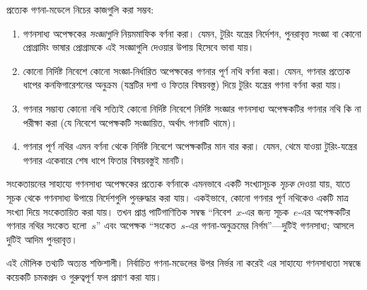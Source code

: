 \documentclass[../../../include/open-logic-section]{subfiles}
\begin{document}

প্রত্যেক গণনা-মডেলে নিচের কাজগুলি করা সম্ভব:
\begin{enumerate}
\item গণনসাধ্য অপেক্ষকের \emph{সংজ্ঞাগুলি} নিয়মমাফিক বর্ণনা করা। যেমন,
  টুরিং যন্ত্রের নির্দেশন, পুনরাবৃত্ত সংজ্ঞা বা কোনো প্রোগ্রামিং ভাষার
  প্রোগ্রামকে এই সংজ্ঞাগুলি দেওয়ার উপায় হিসেবে ভাবা যায়।
\item কোনো নির্দিষ্ট নিবেশে কোনো সংজ্ঞা-নির্ধারিত অপেক্ষকের গণনার পূর্ণ
  নথি বর্ণনা করা। যেমন, গণনার প্রত্যেক ধাপের কনফিগারেশনের অনুক্রম
  (যন্ত্রটির দশা ও ফিতার বিষয়বস্তু) দিয়ে টুরিং যন্ত্রের গণনা বর্ণনা করা
  যায়।
\item গণনার সম্ভাব্য কোনো নথি সত্যিই কোনো নির্দিষ্ট নিবেশে নির্দিষ্ট
  সংজ্ঞার গণনসাধ্য অপেক্ষকটির গণনার নথি কি না পরীক্ষা করা (যে নিবেশে
  অপেক্ষকটি সংজ্ঞায়িত, অর্থাৎ গণনাটি থামে)।
\item গণনার পূর্ণ নথির এমন বর্ণনা থেকে নির্দিষ্ট নিবেশে অপেক্ষকটির মান
  বার করা। যেমন, থেমে যাওয়া টুরিং-যন্ত্রের গণনার একেবারে শেষ ধাপে ফিতার
  বিষয়বস্তুই মানটি।
\end{enumerate}

সংকেতায়নের সাহায্যে গণনসাধ্য অপেক্ষকের প্রত্যেক বর্ণনাকে এমনভাবে একটি
সংখ্যাসূচক \emph{সূচক} দেওয়া যায়, যাতে সূচক থেকে গণনসাধ্য উপায়ে
নির্দেশগুলি পুনরুদ্ধার করা যায়। একইভাবে, কোনো গণনার পূর্ণ নথিকেও একটি
মাত্র সংখ্যা দিয়ে সংকেতায়িত করা যায়। তখন প্রাপ্ত পাটিগাণিতিক সম্বন্ধ
“নিবেশ~$x$-এর জন্য সূচক~$e$-এর অপেক্ষকটির গণনার নথির সংকেত হলো~$s$”
এবং অপেক্ষক “সংকেত~$s$-এর গণনা-অনুক্রমের নির্গম”—দুটিই গণনসাধ্য; আসলে
দুটিই আদিম পুনরাবৃত্ত।

এই মৌলিক তথ্যটি অত্যন্ত শক্তিশালী। নির্বাচিত গণনা-মডেলের উপর নির্ভর না
করেই এর সাহায্যে গণনসাধ্যতা সম্বন্ধে কয়েকটি চমকপ্রদ ও গুরুত্বপূর্ণ ফল
প্রমাণ করা যায়।
\end{document}
